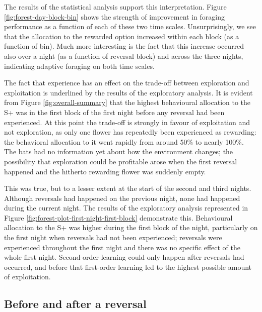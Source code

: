 \documentclass[
]{article}
\begin{document}
The results of the statistical analysis support this interpretation. Figure \ref{fig:forest-day-block-bin} shows the strength of improvement in foraging performance as a function of each of these two time scales. Unsurprisingly, we see that the allocation to the rewarded option increased within each block (as a function of bin). Much more interesting is the fact that this increase occurred also over a night (as a function of reversal block) and across the three nights, indicating adaptive foraging on both time scales.

The fact that experience has an effect on the trade-off between exploration and exploitation is underlined by the results of the exploratory analysis. It is evident from Figure \ref{fig:overall-summary} that the highest behavioural allocation to the S+ was in the first block of the first night before any reversal had been experienced. At this point the trade-off is strongly in favour of exploitation and not exploration, as only one flower has repeatedly been experienced as rewarding: the behavioral allocation to it went rapidly from around 50\% to nearly 100\%. The bats had no information yet about how the environment changes; the possibility that exploration could be profitable arose when the first reversal happened and the hitherto rewarding flower was suddenly empty.

This was true, but to a lesser extent at the start of the second and third nights. Although reversals had happened on the previous night, none had happened during the current night. The results of the exploratory analysis represented in Figure \ref{fig:forest-plot-first-night-first-block} demonstrate this. Behavioural allocation to the S+ was higher during the first block of the night, particularly on the first night when reversals had not been experienced; reversals were experienced throughout the first night and there was no specific effect of the whole first night. Second-order learning could only happen after reversals had occurred, and before that first-order learning led to the highest possible amount of exploitation.

\hypertarget{before-and-after-a-reversal}{%
\subsection{Before and after a reversal}\label{before-and-after-a-reversal}}
\end{document}
